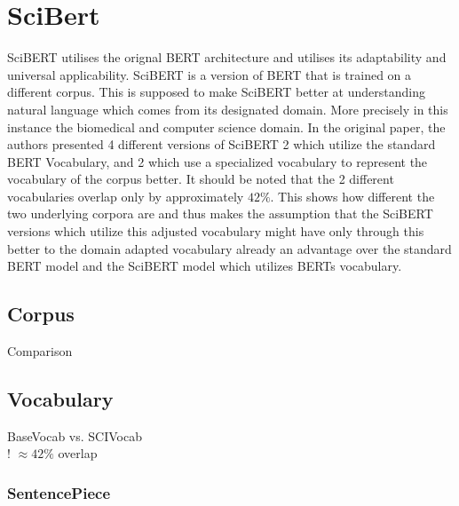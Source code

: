 \chapter{SciBert}
SciBERT utilises the orignal BERT architecture and utilises its adaptability and universal applicability. SciBERT is a version of BERT that is trained on a different corpus. This is supposed to make SciBERT better at understanding natural language which comes from its designated domain. More precisely in this instance the biomedical and computer science domain. In the original paper, the authors presented 4 different versions of SciBERT 2 which utilize the standard BERT Vocabulary, and 2 which use a specialized vocabulary to represent the vocabulary of the corpus better. It should be noted that the 2 different vocabularies overlap only by approximately $42\%$. This shows how different the two underlying corpora are and thus makes the assumption that the SciBERT versions which utilize this adjusted vocabulary might have only through this better to the domain adapted vocabulary already an advantage over the standard BERT model and the SciBERT model which utilizes BERTs vocabulary.

\section{Corpus}
Comparison
\section{Vocabulary}
BaseVocab vs. SCIVocab\\
! $\approx 42\%$ overlap
\subsection{SentencePiece}